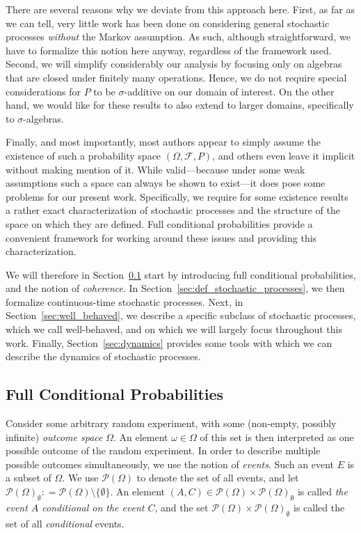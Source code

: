 \documentclass[10pt,a4paper]{paper}
\theoremstyle{definition}
\newcommand{\paths}{\Omega}
\newcommand{\power}{\mathcal{P}(\paths)}
\newcommand{\nonemptypower}{\power_{\emptyset}}
\newcommand{\coloneqq}{:\!=}
\begin{document}
There are several reasons why we deviate from this approach here. First, as far as we can tell, very little work has been done on considering general stochastic processes \emph{without} the Markov assumption. As such, although straightforward, we have to formalize this notion here anyway, regardless of the framework used. Second, we will simplify considerably our analysis by focusing only on algebras that are closed under finitely many operations. Hence, we do not require special considerations for $P$ to be $\sigma$-additive on our domain of interest. On the other hand, we would like for these results to also extend to larger domains, specifically to $\sigma$-algebras. 

Finally, and most importantly, most authors appear to simply assume the existence of such a probability space $(\Omega,\mathcal{F},P)$, and others even leave it implicit without making mention of it. While valid---because under some weak assumptions such a space can always be shown to exist---it does pose some problems for our present work. Specifically, we require for some existence results a rather exact characterization of stochastic processes and the structure of the space on which they are defined. Full conditional probabilities provide a convenient framework for working around these issues and providing this characterization.

We will therefore in Section~\ref{sec:cond_prob} start by introducing full conditional probabilities, and the notion of \emph{coherence}. In Section~\ref{sec:def_stochastic_processes}, we then formalize continuous-time stochastic processes. Next, in Section~\ref{sec:well_behaved}, we describe a specific subclass of stochastic processes, which we call well-behaved, and on which we will largely focus throughout this work. Finally, Section~\ref{sec:dynamics} provides some tools with which we can describe the dynamics of stochastic processes.

\subsection{Full Conditional Probabilities}\label{sec:cond_prob}


Consider some arbitrary random experiment, with some (non-empty, possibly infinite) \emph{outcome space} $\Omega$. An element $\omega\in\Omega$ of this set is then interpreted as one possible outcome of the random experiment. In order to describe multiple possible outcomes simultaneously, we use the notion of \emph{events}. Such an event $E$ is a subset of $\Omega$. We use $\power$ to denote the set of all events, and let $\nonemptypower\coloneqq\power\setminus\{\emptyset\}$. An element $(A,C)\in\power\times\nonemptypower$ is called \emph{the event $A$ conditional on the event $C$}, and the set $\power\times\nonemptypower$ is called the set of all \emph{conditional} events. 
\end{document}
